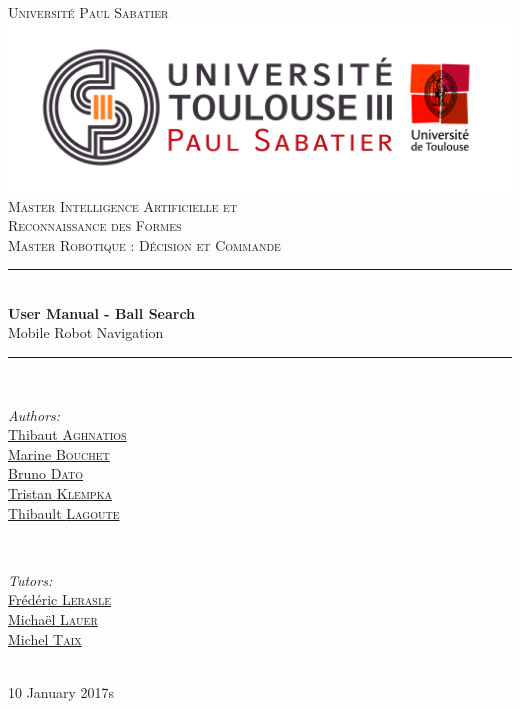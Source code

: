 \documentclass[10pt,a4paper]{article}
\begin{document}
\pagestyle {plain}

\begin{titlepage}


\newcommand{\HRule}{\rule{\linewidth}{0.5mm}} 

\center

\textsc{\Large Université Paul Sabatier}\\[1cm] 
\includegraphics[scale=0.3]{UPS.jpg}\\[0.6cm] 


\textsc{Master Intelligence Artificielle et \\ 
Reconnaissance des Formes \\ Master Robotique : Décision et Commande}\\[3cm] 

\HRule \\[0.4cm]
{ \huge \bfseries User Manual - Ball Search}\\[0.4cm] 
\LARGE Mobile Robot Navigation

\HRule \\[1.5cm]
 

\begin{minipage}{0.4\textwidth}
\begin{flushleft} \large
\emph{Authors:}\\
\href{mailto:thibaut.aghnatios@laposte.net}{Thibaut \textsc{Aghnatios} }  \\
\href{mailto:bouchetmarinee@gmail.com}{Marine \textsc{Bouchet} } \\
\href{mailto:bruno.dato.meneses@gmail.com}{Bruno \textsc{Dato} } \\
\href{mailto:klempka.tristan@gmail.com}{Tristan \textsc{Klempka} } \\
\href{mailto:lagoute.31@gmail.com}{Thibault \textsc{Lagoute} }  
\end{flushleft}
\end{minipage}
~
\begin{minipage}{0.4\textwidth}
\begin{flushright} \large
\emph{Tutors:} \\
\href{mailto:lerasle@laas.fr}{Frédéric \textsc{Lerasle}}\\
\href{mailto:michael.lauer@laas.fr}{Michaël \textsc{Lauer}} \\
\href{mailto:taix@laas.f}{Michel \textsc{Taix}}
\end{flushright}
\end{minipage}\\[5cm]


\large 10 January 2017s
 

\end{titlepage}
\end{document}
